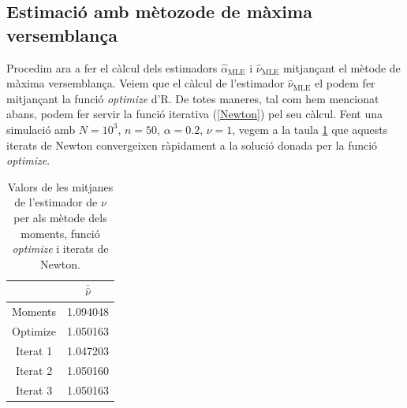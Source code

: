 \documentclass[12pt, catalan]{article}
\numberwithin{table}{section}
\numberwithin{figure}{section}
\numberwithin{equation}{section}
\begin{document}
\subsection{Estimació amb mètozode de màxima versemblança}
Procedim ara a fer el càlcul dels estimadors $\hat{\alpha}_\text{MLE}$ i $\hat{\nu}_\text{MLE}$ mitjançant el mètode de màxima versemblança. Veiem que el càlcul de l'estimador $\hat{\nu} _\text{MLE}$ el podem fer mitjançant la funció \emph{optimize} d'R. De totes maneres, tal com hem mencionat abans, podem fer servir la funció iterativa (\ref{Newton}) pel seu càlcul.
Fent una simulació amb $N=10^3$, $n=50$, $\alpha=0.2$, $\nu=1$, vegem  a la taula \ref{OptimizeNewton} que aquests iterats de Newton convergeixen ràpidament a la solució donada per la funció \emph{optimize}.
\begin{table}[h]
\centering
\caption{Valors de les mitjanes de l'estimador de $\nu$ per als mètode dels moments, funció \emph{optimize} i iterats de Newton.}
\begin{tabular}{|c|c|}
\hline
         & $\overline{\hat{\nu}}$       \\ \hline
Moments  & 1.094048 \\ \hline
Optimize & 1.050163 \\ \hline
Iterat 1 & 1.047203 \\ \hline
Iterat 2 & 1.050160  \\ \hline
Iterat 3 & 1.050163 \\ \hline
\end{tabular}
\label{OptimizeNewton}
\end{table}
\end{document}
